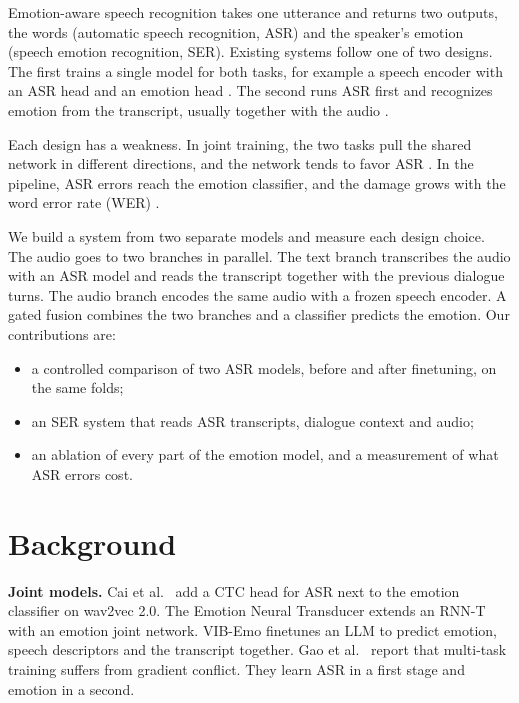 \documentclass[conference]{IEEEtran}
\begin{document}
Emotion-aware speech recognition takes one utterance and returns two outputs, the words (automatic speech
recognition, ASR) and the speaker's emotion (speech emotion recognition, SER). Existing systems follow one of two
designs. The first trains a single model for both tasks, for example a speech encoder with an ASR head and an emotion
head \cite{cai2021mtl,shen2024ent,chen2025vibemo}. The second runs ASR first and recognizes emotion from the
transcript, usually together with the audio \cite{li2024asrtranscripts,he2024mfaedaec}.

Each design has a weakness. In joint training, the two tasks pull the shared network in different directions, and
the network tends to favor ASR \cite{gao2023twostage}. In the pipeline, ASR errors reach the emotion classifier, and
the damage grows with the word error rate (WER) \cite{li2024asrtranscripts}.

We build a system from two separate models and measure each design choice. The audio goes to two branches in
parallel. The text branch transcribes the audio with an ASR model and reads the transcript together with the previous
dialogue turns. The audio branch encodes the same audio with a frozen speech encoder. A gated fusion combines the two
branches and a classifier predicts the emotion. Our contributions are:
\begin{itemize}
  \item a controlled comparison of two ASR models, before and after finetuning, on the same folds;
  \item an SER system that reads ASR transcripts, dialogue context and audio;
  \item an ablation of every part of the emotion model, and a measurement of what ASR errors cost.
\end{itemize}

\section{Background}

\textbf{Joint models.} Cai et al.\ \cite{cai2021mtl} add a CTC head for ASR next to the emotion classifier on
wav2vec 2.0. The Emotion Neural Transducer \cite{shen2024ent} extends an RNN-T with an emotion joint network.
VIB-Emo \cite{chen2025vibemo} finetunes an LLM to predict emotion, speech descriptors and the transcript together.
Gao et al.\ \cite{gao2023twostage} report that multi-task training suffers from gradient conflict. They learn ASR in
a first stage and emotion in a second.
\end{document}
